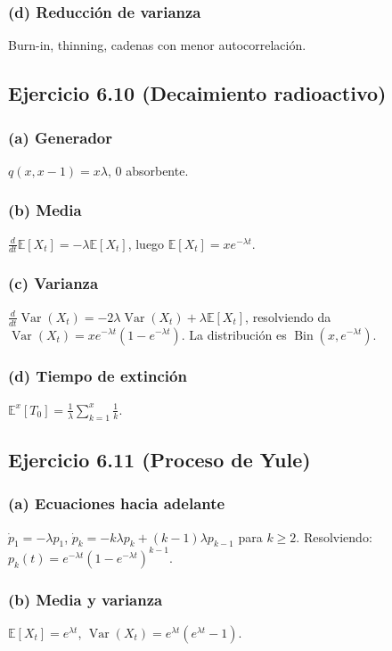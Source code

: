 \documentclass[letterpaper, 12pt]{article}
\newcommand{\E}{\mathbb{E}}
\newcommand{\1}{\mathbbm{1}}
\DeclareMathOperator{\Var}{Var}
\DeclareMathOperator{\Bin}{Bin}
\begin{document}
    \subsubsection*{(d) Reducci\'on de varianza}
    Burn-in, thinning, cadenas con menor autocorrelaci\'on.

    \subsection{Ejercicio 6.10 (Decaimiento radioactivo)}

    \subsubsection*{(a) Generador}
    $q(x,x-1)=x\lambda$, $0$ absorbente.

    \subsubsection*{(b) Media}
    $\frac{d}{dt}\E[X_t]=-\lambda\E[X_t]$, luego $\E[X_t]=xe^{-\lambda t}$.

    \subsubsection*{(c) Varianza}
    $\frac{d}{dt}\Var(X_t)=-2\lambda\Var(X_t)+\lambda\E[X_t]$, resolviendo da $\Var(X_t)=xe^{-\lambda t}(1-e^{-\lambda t})$. La distribuci\'on es $\Bin(x,e^{-\lambda t})$.

    \subsubsection*{(d) Tiempo de extinci\'on}
    $\E^x[T_0]=\frac1\lambda\sum_{k=1}^x\frac1k$.

    \subsection{Ejercicio 6.11 (Proceso de Yule)}

    \subsubsection*{(a) Ecuaciones hacia adelante}
    $\dot{p}_1=-\lambda p_1$, $\dot{p}_k=-k\lambda p_k+(k-1)\lambda p_{k-1}$ para $k\ge2$. Resolviendo: $p_k(t)=e^{-\lambda t}(1-e^{-\lambda t})^{k-1}$.

    \subsubsection*{(b) Media y varianza}
    $\E[X_t]=e^{\lambda t}$, $\Var(X_t)=e^{\lambda t}(e^{\lambda t}-1)$.
\end{document}
